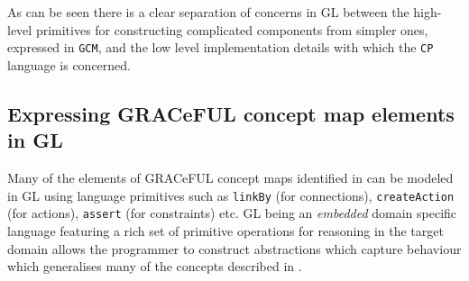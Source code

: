 As can be seen there is a clear separation of concerns in GL between the high-level primitives
for constructing complicated components from simpler ones, expressed in \texttt{GCM}, and the low level
implementation details with which the \texttt{CP} language is concerned.

\subsection{Expressing GRACeFUL concept map elements in GL}
Many of the elements of GRACeFUL concept maps identified in \cite{D4.1} can be modeled in
GL using language primitives such as \texttt{linkBy} (for connections),
\texttt{createAction} (for actions), \texttt{assert} (for constraints) etc.
GL being an \textit{embedded} domain specific language featuring a rich set of primitive
operations for reasoning in the target domain allows the programmer to construct
abstractions which capture behaviour which generalises many of the concepts described
in \cite{D4.1}.
